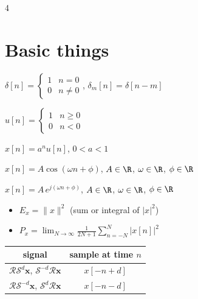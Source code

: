 \documentclass[8pt,a4paper,landscape]{extarticle}
\begin{document}
\begin{multicols*}{4}



\section{Basic things}
\begin{defn}[title=Unit impulse | Delta]
$\delta[n] = \begin{cases}1 & n=0\\0 & n\ne 0\end{cases}$, \quad $\delta_m[n] = \delta[n-m]$
\end{defn}

\begin{defn}[title=Unit step]
$u[n] = \begin{cases}1 & n\ge 0\\0 & n<0\end{cases}$
\end{defn}

\begin{defn}[title=Exponential decay]
$x[n] = a^n u[n]$, \quad $0 < a < 1$
\end{defn}

\begin{defn}[title=Sinusoidal oscillation]
$x[n] = A \cos(\omega n + \phi)$, \quad $A\in\R$, $\omega\in\R$, $\phi\in\R$
\end{defn}

\begin{defn}[title=Complex exponential]
$x[n] = A\,e^{j(\omega n + \phi)}$, \quad $A\in\R$, $\omega\in\R$, $\phi\in\R$
\end{defn}

\begin{thm}[title=Energy and Power]
\begin{itemize}
  \item $E_x = \|x\|^2$ \quad (sum or integral of $|x|^2$)
  \item $P_x = \lim_{N\to\infty}\frac{1}{2N+1}\sum_{n=-N}^{N}|x[n]|^2$
\end{itemize}
\end{thm}

\begin{defn}[title=Operator combinations]
\begin{center}
\begin{tabular}{cc}
\toprule
signal & sample at time $n$ \\
\midrule
$\mathcal{R}\mathcal{S}^d\mathbf{x}$, \; $\mathcal{S}^{-d}\mathcal{R}\mathbf{x}$ & $x[-n+d]$ \\
\midrule
$\mathcal{R}\mathcal{S}^{-d}\mathbf{x}$, \; $\mathcal{S}^d\mathcal{R}\mathbf{x}$ & $x[-n-d]$ \\
\bottomrule
\end{tabular}
\end{center}
\end{defn}


\end{multicols*}
\end{document}
